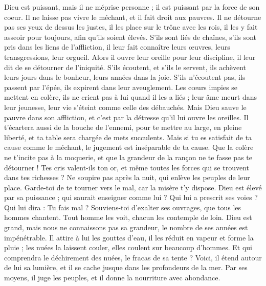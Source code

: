 \begin{multicols}{2}
Dieu est puissant, mais il ne méprise personne ; il est puissant par la force de son coeur.
Il ne laisse pas vivre le méchant, et il fait droit aux pauvres.
Il ne détourne pas ses yeux de dessus les justes, il les place sur le trône avec les rois, il les y fait asseoir pour toujours, afin qu'ils soient élevés.
S'ils sont liés de chaînes, s'ils sont pris dans les liens de l'affliction,
il leur fait connaître leurs œuvres, leurs transgressions, leur orgueil.
Alors il ouvre leur oreille pour leur discipline, il leur dit de se détourner de l'iniquité.
S'ils écoutent, et s'ils le servent, ils achèvent leurs jours dans le bonheur, leurs années dans la joie.
S'ils n'écoutent pas, ils passent par l'épée, ils expirent dans leur aveuglement.
Les cœurs impies se mettent en colère, ils ne crient pas à lui quand il les a liés ;
leur âme meurt dans leur jeunesse, leur vie s'éteint comme celle des débauchés.
Mais Dieu sauve le pauvre dans son affliction, et c'est par la détresse qu'il lui ouvre les oreilles.
Il t'écartera aussi de la bouche de l'ennemi, pour te mettre au large, en pleine liberté, et ta table sera chargée de mets succulents.
Mais si tu es satisfait de ta cause comme le méchant, le jugement est inséparable de ta cause.
Que la colère ne t'incite pas à la moquerie, et que la grandeur de la rançon ne te fasse pas te détourner !
Tes cris valent-ils ton or, et même toutes les forces qui se trouvent dans tes richesses ?
Ne soupire pas après la nuit, qui enlève les peuples de leur place.
Garde-toi de te tourner vers le mal, car la misère t'y dispose.
Dieu est élevé par sa puissance ; qui saurait enseigner comme lui ?
Qui lui a prescrit ses voies ? Qui lui dira : Tu fais mal ?
Souviens-toi d'exalter ses ouvrages, que tous les hommes chantent.
Tout homme les voit, chacun les contemple de loin.
Dieu est grand, mais nous ne connaissons pas sa grandeur, le nombre de ses années est impénétrable.
Il attire à lui les gouttes d'eau, il les réduit en vapeur et forme la pluie ;
les nuées la laissent couler, elles coulent sur beaucoup d'hommes.
Et qui comprendra le déchirement des nuées, le fracas de sa tente ?
Voici, il étend autour de lui sa lumière, et il se cache jusque dans les profondeurs de la mer.
Par ses moyens, il juge les peuples, et il donne la nourriture avec abondance.

\end{multicols}
